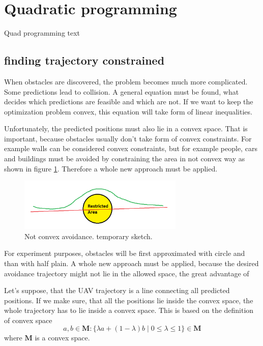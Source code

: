 


\section{Quadratic programming}

Quad programming text \cite{cameraModule}

\subsection{finding trajectory constrained}
When obstacles are discovered, the problem becomes much more complicated. Some predictions lead to collision. A general equation must be found, what decides which predictions are feasible and which are not. If we want to keep the optimization problem convex, this equation will take form of linear inequalities. 

Unfortunately, the predicted positions must also lie in a convex space. That is important, because 
obstacles usually don't take form of convex constraints. For example walls can be considered convex constraints, but for example people, cars and buildings must be avoided by constraining the area in not convex way as shown in figure \ref{fig:avoidance}. Therefore a whole new approach must be applied. 

\begin{figure}[H]
\centering
\includegraphics[width=0.7\textwidth]{fig/avoidance.png}
\caption{Not convex avoidance. temporary sketch.}
\label{fig:avoidance}
\end{figure}

For experiment purposes, obstacles will be first approximated with circle and than with half plain. A whole new approach must be applied, because the desired avoidance trajectory might not lie in the allowed space, the great advantage of 


Let's suppose, that the UAV trajectory is a line connecting all predicted positions. If we make sure, that all the positions lie inside the convex space, the whole trajectory has to lie inside a convex space. This is based on the definition of convex space
\begin{equation}
\label{eq:convex_definition}
a,b\in \textbf{M}: \{\lambda a+(1-\lambda) b \mid 0 \leq \lambda \leq 1 \}\in \textbf{M}
\end{equation}
where $\textbf{M}$ is a convex space. 

